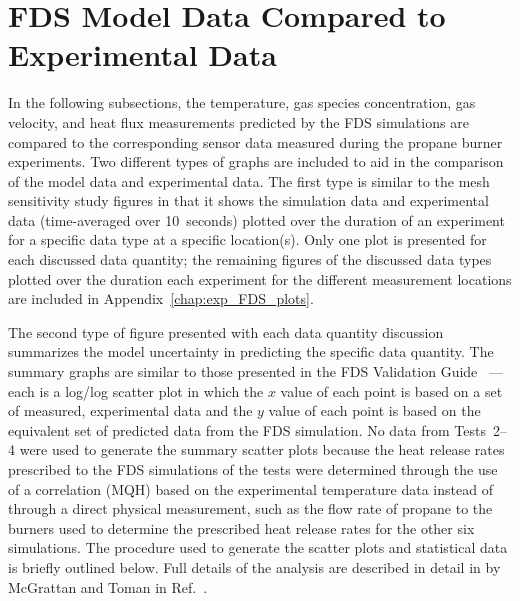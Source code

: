 \section{FDS Model Data Compared to Experimental Data}
In the following subsections, the temperature, gas species concentration, gas velocity, and heat flux measurements predicted by the FDS simulations are compared to the corresponding sensor data measured during the propane burner experiments. Two different types of graphs are included to aid in the comparison of the model data and experimental data. The first type is similar to the mesh sensitivity study figures in that it shows the simulation data and experimental data (time-averaged over 10~seconds) plotted over the duration of an experiment for a specific data type at a specific location(s). Only one plot is presented for each discussed data quantity; the remaining figures of the discussed data types plotted over the duration each experiment for the different measurement locations are included in Appendix~\ref{chap:exp_FDS_plots}.

The second type of figure presented with each data quantity discussion summarizes the model uncertainty in predicting the specific data quantity. The summary graphs are similar to those presented in the FDS Validation Guide~\cite{FDS_Validation_Guide} --- each is a log/log scatter plot in which the $x$ value of each point is based on a set of measured, experimental data and the $y$ value of each point is based on the equivalent set of predicted data from the FDS simulation. No data from Tests~2--4 were used to generate the summary scatter plots because the heat release rates prescribed to the FDS simulations of the tests were determined through the use of a correlation (MQH) based on the experimental temperature data instead of through a direct physical measurement, such as the flow rate of propane to the burners used to determine the prescribed heat release rates for the other six simulations. The procedure used to generate the scatter plots and statistical data is briefly outlined below. Full details of the analysis are described in detail in by McGrattan and Toman in Ref.~\cite{McGrattan:Metrologia}.

